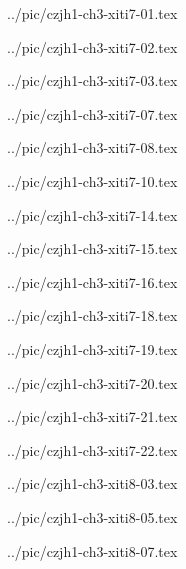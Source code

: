 

../pic/czjh1-ch3-xiti7-01.tex



../pic/czjh1-ch3-xiti7-02.tex



../pic/czjh1-ch3-xiti7-03.tex



../pic/czjh1-ch3-xiti7-07.tex



../pic/czjh1-ch3-xiti7-08.tex



../pic/czjh1-ch3-xiti7-10.tex



../pic/czjh1-ch3-xiti7-14.tex



../pic/czjh1-ch3-xiti7-15.tex



../pic/czjh1-ch3-xiti7-16.tex



../pic/czjh1-ch3-xiti7-18.tex



../pic/czjh1-ch3-xiti7-19.tex



../pic/czjh1-ch3-xiti7-20.tex



../pic/czjh1-ch3-xiti7-21.tex



../pic/czjh1-ch3-xiti7-22.tex



../pic/czjh1-ch3-xiti8-03.tex



../pic/czjh1-ch3-xiti8-05.tex



../pic/czjh1-ch3-xiti8-07.tex



